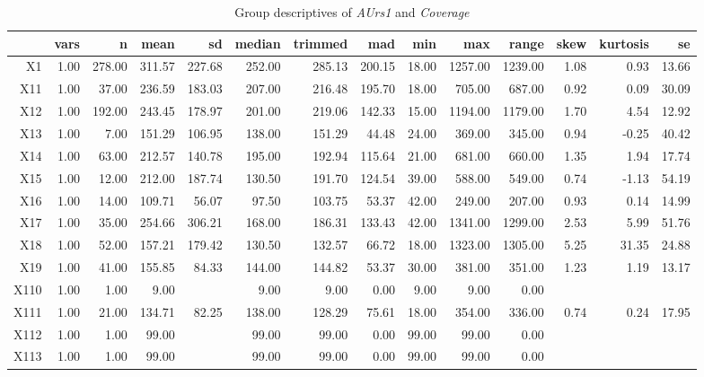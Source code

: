 \begin{table}[ht]
	\small
	\centering
	\begin{tabular}{rrrrrrrrrrrrrr}
		\hline
	   & vars & n & mean & sd & median & trimmed & mad & min & max & range & skew & kurtosis & se \\ 
		\hline
	  X1 & 1.00 & 278.00 & 311.57 & 227.68 & 252.00 & 285.13 & 200.15 & 18.00 & 1257.00 & 1239.00 & 1.08 & 0.93 & 13.66 \\ 
		X11 & 1.00 & 37.00 & 236.59 & 183.03 & 207.00 & 216.48 & 195.70 & 18.00 & 705.00 & 687.00 & 0.92 & 0.09 & 30.09 \\ 
		X12 & 1.00 & 192.00 & 243.45 & 178.97 & 201.00 & 219.06 & 142.33 & 15.00 & 1194.00 & 1179.00 & 1.70 & 4.54 & 12.92 \\ 
		X13 & 1.00 & 7.00 & 151.29 & 106.95 & 138.00 & 151.29 & 44.48 & 24.00 & 369.00 & 345.00 & 0.94 & -0.25 & 40.42 \\ 
		X14 & 1.00 & 63.00 & 212.57 & 140.78 & 195.00 & 192.94 & 115.64 & 21.00 & 681.00 & 660.00 & 1.35 & 1.94 & 17.74 \\ 
		X15 & 1.00 & 12.00 & 212.00 & 187.74 & 130.50 & 191.70 & 124.54 & 39.00 & 588.00 & 549.00 & 0.74 & -1.13 & 54.19 \\ 
		X16 & 1.00 & 14.00 & 109.71 & 56.07 & 97.50 & 103.75 & 53.37 & 42.00 & 249.00 & 207.00 & 0.93 & 0.14 & 14.99 \\ 
		X17 & 1.00 & 35.00 & 254.66 & 306.21 & 168.00 & 186.31 & 133.43 & 42.00 & 1341.00 & 1299.00 & 2.53 & 5.99 & 51.76 \\ 
		X18 & 1.00 & 52.00 & 157.21 & 179.42 & 130.50 & 132.57 & 66.72 & 18.00 & 1323.00 & 1305.00 & 5.25 & 31.35 & 24.88 \\ 
		X19 & 1.00 & 41.00 & 155.85 & 84.33 & 144.00 & 144.82 & 53.37 & 30.00 & 381.00 & 351.00 & 1.23 & 1.19 & 13.17 \\ 
		X110 & 1.00 & 1.00 & 9.00 &  & 9.00 & 9.00 & 0.00 & 9.00 & 9.00 & 0.00 &  &  &  \\ 
		X111 & 1.00 & 21.00 & 134.71 & 82.25 & 138.00 & 128.29 & 75.61 & 18.00 & 354.00 & 336.00 & 0.74 & 0.24 & 17.95 \\ 
		X112 & 1.00 & 1.00 & 99.00 &  & 99.00 & 99.00 & 0.00 & 99.00 & 99.00 & 0.00 &  &  &  \\ 
		X113 & 1.00 & 1.00 & 99.00 &  & 99.00 & 99.00 & 0.00 & 99.00 & 99.00 & 0.00 &  &  &  \\ 
		 \hline
	  \end{tabular}
    \caption{Group descriptives of \textit{AUrs1} and \textit{Coverage}}
    \label{tbl:descriptives_baysis_initiator_AUrs1_Cov}
\end{table}

